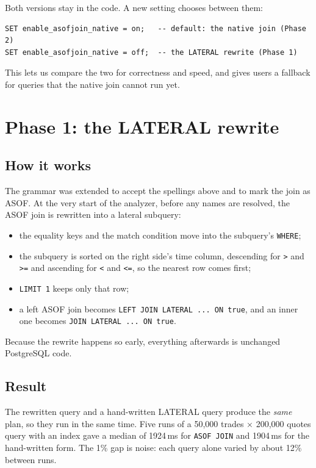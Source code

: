 \documentclass[11pt,a4paper]{article}
\newcommand{\code}[1]{\texttt{#1}}
\begin{document}
Both versions stay in the code. A new setting chooses between them:

\begin{lstlisting}
SET enable_asofjoin_native = on;   -- default: the native join (Phase 2)
SET enable_asofjoin_native = off;  -- the LATERAL rewrite (Phase 1)
\end{lstlisting}

This lets us compare the two for correctness and speed, and gives users a fallback for
queries that the native join cannot run yet.

\section{Phase 1: the LATERAL rewrite}

\subsection{How it works}

The grammar was extended to accept the spellings above and to mark the join as ASOF. At
the very start of the analyzer, before any names are resolved, the ASOF join is rewritten
into a lateral subquery:

\begin{itemize}
  \item the equality keys and the match condition move into the subquery's \code{WHERE};
  \item the subquery is sorted on the right side's time column, descending for \code{>}
        and \code{>=} and ascending for \code{<} and \code{<=}, so the nearest row comes
        first;
  \item \code{LIMIT 1} keeps only that row;
  \item a left ASOF join becomes \code{LEFT JOIN LATERAL ... ON true}, and an inner one
        becomes \code{JOIN LATERAL ... ON true}.
\end{itemize}

Because the rewrite happens so early, everything afterwards is unchanged PostgreSQL code.

\subsection{Result}

The rewritten query and a hand-written LATERAL query produce the \emph{same} plan, so
they run in the same time. Five runs of a 50,000 trades $\times$ 200,000 quotes query with
an index gave a median of 1924\,ms for \code{ASOF JOIN} and 1904\,ms for the hand-written
form. The 1\% gap is noise: each query alone varied by about 12\% between runs.
\end{document}
